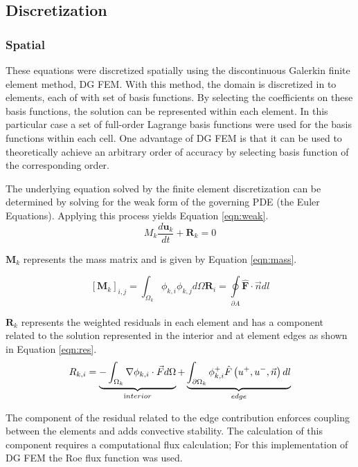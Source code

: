 \documentclass{article}
\begin{document}
\subsection{Discretization}
	\subsubsection{Spatial}
	These equations were discretized spatially using the discontinuous Galerkin finite element method, DG FEM.
	With this method, the domain is discretized in to elements, each of with set of basis functions.
	By selecting the coefficients on these basis functions, the solution can be represented within each element.
	In this particular case a set of full-order Lagrange basis functions were used for the basis functions within each cell.
	One advantage of DG FEM is that  it can be used to theoretically achieve an arbitrary order of accuracy by selecting basis function of the corresponding order.

	The underlying equation solved by the finite element discretization can be determined by solving for the weak form of the governing PDE (the Euler Equations).
	Applying this process yields Equation \ref{eqn:weak}.
	\begin{equation}
		M_k\frac{d\mathbf{u}_k}{dt} + \mathbf{R}_k =  0
		\label{eqn:weak}
	\end{equation}


	$\mathbf{M}_{k}$ represents the mass matrix and is given by Equation \ref{eqn:mass}.


	\begin{equation}
		\left[\mathbf{M}_{k}\right]_{i, j}=\int_{\Omega_{k}} \phi_{k, i} \phi_{k, j} d \Omega
		\mathbf{R}_i = \oint\limits_{\partial{A}} \mathbf{\hat{F}} \cdot \vec{n} dl
		\label{eqn:mass}
	\end{equation}

	$\mathbf{R}_k$ represents the weighted residuals in each element and has a component related to the solution represented in the interior and at element edges as shown in Equation \ref{eqn:res}.
	\begin{equation}
		R_{k, i}=\underbrace{-\int_{\Omega_{k}} \nabla \phi_{k, i} \cdot \vec{F} d \Omega}_{\text interior}+ \underbrace{\int_{\partial \Omega_{k}} \phi_{k, i}^{+} \hat{F}\left(u^{+}, u^{-}, \vec{n}\right) dl}_{edge}
		\label{eqn:res}
	\end{equation}

	The component of the residual related to the edge contribution enforces coupling between the elements and adds convective stability.
	The calculation of this component requires a computational flux calculation; For this implementation of DG FEM the Roe flux function was used.
\end{document}
